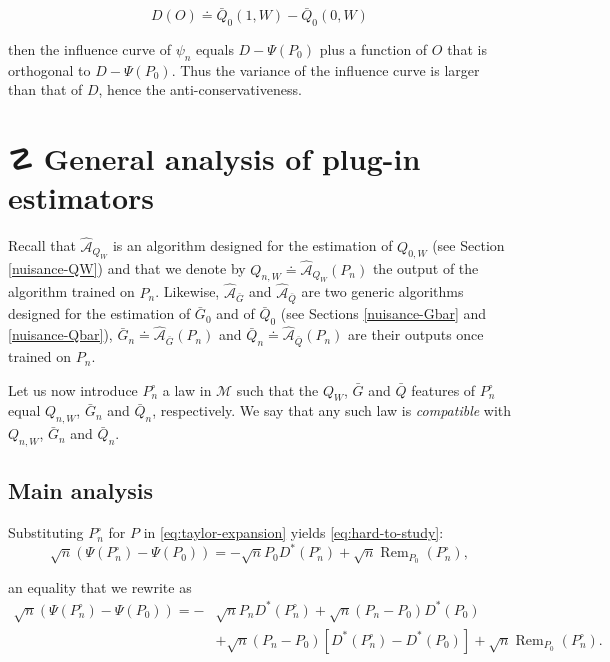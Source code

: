 \documentclass[
  11pt,
  openright,twoside]{book}
\DeclareMathOperator{\Rem}{Rem}
\DeclareRobustCommand{\stixdanger}{%
  {\usefont{U}{stixbbit}{m}{it}\symbol{"F6}}%
}
\newcommand{\Algo}{\widehat{\mathcal{A}}}
\newcommand{\defq}{\doteq}
\newcommand{\calM}{\mathcal{M}}
\newcommand{\Gbar}{\bar{G}}
\newcommand{\Phat}{P^{\circ}}
\newcommand{\Qbar}{\bar{Q}}
\theoremstyle{definition}
\theoremstyle{definition}
\theoremstyle{definition}
\theoremstyle{definition}
\theoremstyle{remark}
\begin{document}
\begin{equation*}
D(O) \defq \Qbar_{0}(1,W) - \Qbar_{0}(0,W)
\end{equation*}

then the influence curve of \(\psi_{n}\) equals \(D - \Psi(P_{0})\) plus a
function of \(O\) that is orthogonal to \(D - \Psi(P_{0})\). Thus the variance of
the influence curve is larger than that of \(D\), hence the
anti-conservativeness.

\hypertarget{app-analysis-of-plug-in}{%
\section{\texorpdfstring{☡ \stixdanger{} General analysis of plug-in estimators}{☡  General analysis of plug-in estimators}}\label{app-analysis-of-plug-in}}

Recall that \(\Algo_{Q_{W}}\) is an algorithm designed for the estimation of
\(Q_{0,W}\) (see Section \ref{nuisance-QW}) and that we denote by \(Q_{n,W} \defq \Algo_{Q_{W}}(P_{n})\) the output of the algorithm trained on \(P_{n}\).
Likewise, \(\Algo_{\Gbar}\) and \(\Algo_{\Qbar}\) are two generic algorithms
designed for the estimation of \(\Gbar_{0}\) and of \(\Qbar_{0}\) (see Sections
\ref{nuisance-Gbar} and \ref{nuisance-Qbar}), \(\Gbar_{n} \defq \Algo_{\Gbar}(P_{n})\) and \(\Qbar_{n} \defq \Algo_{\Qbar}(P_{n})\) are their
outputs once trained on \(P_{n}\).

Let us now introduce \(\Phat_n\) a law in \(\calM\) such that the \(Q_{W}\), \(\Gbar\)
and \(\Qbar\) features of \(\Phat_n\) equal \(Q_{n,W}\), \(\Gbar_{n}\) and
\(\Qbar_{n}\), respectively. We say that any such law is \emph{compatible} with
\(Q_{n,W}\), \(\Gbar_n\) and \(\Qbar_n\).

\hypertarget{app-analysis-of-plug-in-main}{%
\subsection{Main analysis}\label{app-analysis-of-plug-in-main}}

Substituting \(\Phat_n\) for \(P\) in \eqref{eq:taylor-expansion} yields
\eqref{eq:hard-to-study}:
\begin{equation} 
\sqrt{n} (\Psi(\Phat_n) - \Psi(P_0)) =  - \sqrt{n} P_0 D^*(\Phat_n) + \sqrt{n}
\Rem_{P_0}(\Phat_n), 
\end{equation}

an equality that we rewrite as
\begin{align} 
\sqrt{n} (\Psi(\Phat_n) - \Psi(P_0)) = - & \sqrt{n} P_n D^*(\Phat_n) + \sqrt{n}
(P_n - P_0) D^*(P_0)\\ & + \sqrt{n}(P_n - P_0) [D^*(\Phat_n) - D^*(P_0)] +
\sqrt{n}\Rem_{P_0}(\Phat_n). 
\end{align}
\end{document}
